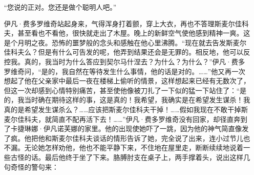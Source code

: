 \par “您说的正对。您还是做个聪明人吧。”
\par 伊凡·费多罗维奇站起身来，气得浑身打着颤，穿上大衣，再也不答理斯麦尔佳科夫，甚至看也不看他，很快就走出了木屋。晚上的新鲜空气使他感到精神一爽。这是个月明之夜。恐怖的噩梦般的念头和感触在他心里沸腾。“现在就去告发斯麦尔佳科夫么？但是有什么可告发的呢，他弄到结果还会是无罪的。相反地，他可以反控我。真的，我当时为什么答应到契尔马什涅去？为什么？为什么？”伊凡·费多罗维奇问，“是的，我自然在等待发生什么事情，他的话是对的。……”他又再一次想起了他在父亲家中最后一夜在楼梯上偷听的情景，这样想起来已经有无数次了，但这一次却感到心情特别痛苦，甚至使他像被刀扎了一下似的猛一下站住了：“是的，我当时确在期待这样的事，这是真的！我希望，我确实是在希望发生谋杀！我真的是希望发生谋杀么？……应该把斯麦尔佳科夫干掉！……假如我现在不敢干掉斯麦尔佳科夫，就简直不配再活下去！……”伊凡·费多罗维奇没有回家，却径直奔到了卡捷琳娜·伊凡诺芙娜的家里。他的出现使她吓了一跳，因为他的神气简直像发了疯。他把他和斯麦尔佳科夫谈话的情形告诉了她，完全说了出来，连小过节儿也不漏。无论她怎样劝他，他也不能平静下来，不住地在屋里走，断断续续地说着一些古怪的话。最后他终于坐了下来。胳膊肘支在桌子上，两手撑着头，说出这样几句奇怪的警句来：
